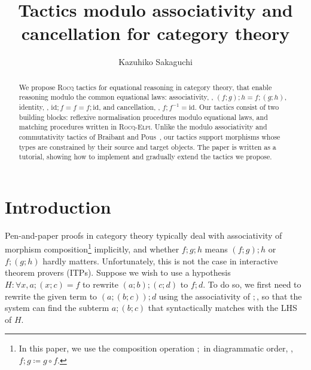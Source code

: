 \documentclass[a4paper,UKenglish,cleveref,autoref]{lipics-v2021}
\title{Tactics modulo associativity and cancellation for category theory}
\author{Kazuhiko Sakaguchi}{ CNRS, ENS de Lyon, UCBL, LIP, UMR 5668, France}{kazuhiko.sakaguchi@ens-lyon.fr}{https://orcid.org/0000-0003-1855-5189}{}%
\newcommand{\Rocq}{{\sffamily\scshape Rocq}\xspace}
\newcommand{\RocqElpi}{{\sffamily\scshape Rocq-Elpi}\xspace}
\begin{document}
\maketitle

\begin{abstract}
  We propose \Rocq tactics for equational reasoning in category theory, that enable reasoning modulo
  the common equational laws:
  associativity, \ie, $(f ; g) ; h = f ; (g ; h)$,
  identity, \ie, $\mathrm{id}; f = f = f; \mathrm{id}$, and
  cancellation, \ie, $f ; f^{-1} = \mathrm{id}$.
  Our tactics consist of two building blocks: reflexive normalisation procedures modulo equational
  laws, and matching procedures written in \RocqElpi.
  Unlike the modulo associativity and commutativity tactics of Braibant and
  Pous~\cite{DBLP:conf/cpp/BraibantP11}, our tactics support morphisms whose types are constrained
  by their source and target objects.
  The paper is written as a tutorial, showing how to implement and gradually extend the tactics we
  propose.
\end{abstract}

\section{Introduction}
\label{sec:introduction}

Pen-and-paper proofs in category theory typically deal with associativity of morphism
composition\footnote{In this paper, we use the composition operation $;$ in diagrammatic order, \ie,
$f ; g \coloneq g \circ f$.} implicitly, and whether $f ; g ; h$ means $(f ; g) ; h$ or
$f ; (g ; h)$ hardly matters.
%
Unfortunately, this is not the case in interactive theorem provers (ITPs).
Suppose we wish to use a hypothesis $H : \forall x, a ; (x ; c) = f$ to rewrite
$(a ; b) ; (c ; d)$ to $f ; d$.
To do so, we first need to rewrite the given term to $(a ; (b ; c)) ; d$ using the associativity of
$;$, so that the system can find the subterm $a ; (b ; c)$ that syntactically matches with the LHS
of $H$.
\end{document}
